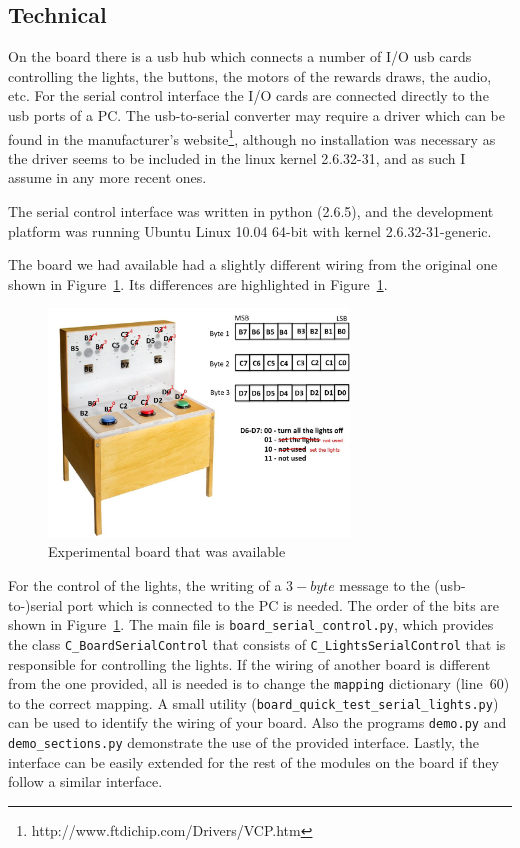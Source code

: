 \documentclass[conference]{IEEEtran}
\begin{document}
\subsection{Technical}
On the board there is a usb hub which connects a number of I/O usb
cards controlling the lights, the buttons, the motors of the rewards
draws, the audio, etc. For the serial control interface the I/O cards
are connected directly to the usb ports of a PC. The usb-to-serial
converter may require a driver which can be found in the
manufacturer's
website\footnote{http://www.ftdichip.com/Drivers/VCP.htm}, although no
installation was necessary as the driver seems to be included in the
linux kernel 2.6.32-31, and as such I assume in any more recent ones.

The serial control interface was written in python (2.6.5), and the
development platform was running Ubuntu Linux 10.04 64-bit with kernel
2.6.32-31-generic.

The board we had available had a slightly different wiring from the
original one shown in Figure~\ref{fig:experimental_board2}. Its
differences are highlighted in Figure~\ref{fig:experimental_board2}.
\begin{figure}[htb]
\begin{center}
\includegraphics[width=8cm]{lights2.jpg}
\end{center}
\caption{Experimental board that was available}
\label{fig:experimental_board2}
\end{figure}

For the control of the lights, the writing of a $3-byte$ message to
the (usb-to-)serial port which is connected to the PC is needed. The
order of the bits are shown in
Figure~\ref{fig:experimental_board2}. The main file is
\texttt{board\_serial\_control.py}, which provides the class
\texttt{C\_BoardSerialControl} that consists of
\texttt{C\_LightsSerialControl} that is responsible for controlling
the lights. If the wiring of another board is different from the one
provided, all is needed is to change the \texttt{mapping} dictionary
(line~60) to the correct mapping. A small utility
(\texttt{board\_quick\_test\_serial\_lights.py}) can be used to
identify the wiring of your board. Also the programs \texttt{demo.py}
and \texttt{demo\_sections.py} demonstrate the use of the provided
interface. Lastly, the interface can be easily extended for the rest
of the modules on the board if they follow a similar interface.



% 


\end{document}
